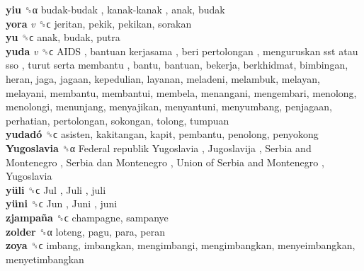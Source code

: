 \textbf{yiu} ␝α   budak-budak ,  kanak-kanak , anak, budak  \\
\textbf{yora} \emph{v}  ␝ϲ  jeritan, pekik, pekikan, sorakan  \\
\textbf{yu} ␝ϲ  anak, budak, putra  \\
\textbf{yuda} \emph{v}  ␝ϲ   AIDS ,  bantuan kerjasama ,  beri pertolongan ,  menguruskan sst atau sso ,  turut serta membantu , bantu, bantuan, bekerja, berkhidmat, bimbingan, heran, jaga, jagaan, kepedulian, layanan, meladeni, melambuk, melayan, melayani, membantu, membantui, membela, menangani, mengembari, menolong, menolongi, menunjang, menyajikan, menyantuni, menyumbang, penjagaan, perhatian, pertolongan, sokongan, tolong, tumpuan  \\
\textbf{yudadó} ␝ϲ  asisten, kakitangan, kapit, pembantu, penolong, penyokong  \\
\textbf{Yugoslavia} ␝α   Federal republik Yugoslavia ,  Jugoslavija ,  Serbia and Montenegro ,  Serbia dan Montenegro ,  Union of Serbia and Montenegro ,  Yugoslavia   \\
\textbf{yüli} ␝ϲ   Jul ,  Juli , juli  \\
\textbf{yüni} ␝ϲ   Jun ,  Juni , juni  \\
\textbf{zjampaña} ␝ϲ  champagne, sampanye  \\
\textbf{zolder} ␝α  loteng, pagu, para, peran  \\
\textbf{zoya} ␝ϲ  imbang, imbangkan, mengimbangi, mengimbangkan, menyeimbangkan, menyetimbangkan  \\
